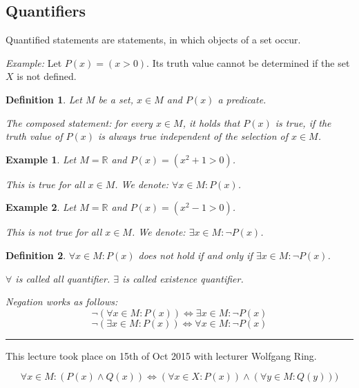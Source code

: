 \documentclass[a4paper,landscape,twocolumn]{article}
\newtheorem{defi}{Definition}
\newtheorem{ex}{Example}
\newcommand\meta[3]{\hrule{} This #1 took place on #2 with lecturer #3.\par}
\begin{document}
\subsection{Quantifiers}
%
Quantified statements are statements, in which objects of a set occur.

\emph{Example:} Let $P(x) = (x > 0)$. Its truth value cannot be determined
if the set $X$ is not defined.

\begin{defi}
  Let $M$ be a set, $x \in M$ and $P(x)$ a predicate.

  The composed statement: for every $x \in M$, it holds that $P(x)$ is true,
  if the truth value of $P(x)$ is always true independent of the selection of $x \in M$.
\end{defi}

\begin{ex}
  Let $M = \mathbb R$ and $P(x) = (x^2 + 1 > 0)$.

  This is true for all $x \in M$.
  We denote: $\forall x \in M: P(x)$.
\end{ex}

\begin{ex}
  Let $M = \mathbb R$ and $P(x) = (x^2 - 1 > 0)$.

  This is \emph{not} true for all $x \in M$.
  We denote: $\exists x \in M: \neg P(x)$.
\end{ex}

\begin{defi}
  $\forall x \in M: P(x)$ does not hold if and only if $\exists x \in M: \neg P(x)$.

  $\forall$ is called \emph{all quantifier}.
  $\exists$ is called \emph{existence quantifier}.

  Negation works as follows:
  \[ \neg\left(\forall x \in M: P(x)\right) \Leftrightarrow \exists x \in M: \neg P(x) \]
  \[ \neg\left(\exists x \in M: P(x)\right) \Leftrightarrow \forall x \in M: \neg P(x) \]
\end{defi}


\meta{lecture}{15th of Oct 2015}{Wolfgang Ring}

\[ \forall x \in M: (P(x) \land Q(x)) \iff (\forall x \in X: P(x)) \land (\forall y \in M: Q(y))) \]
\end{document}
